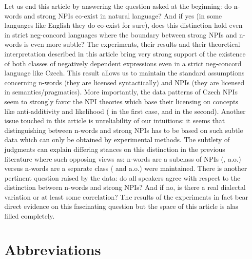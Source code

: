 \documentclass[output=paper,
]{langscibook}
\begin{document}
Let us end this article by answering the question asked at the beginning: do  n-words and strong NPIs co-exist in natural language? And if yes (in some languages like English they do co-exist for sure), does this distinction hold even in strict neg-concord languages where the boundary between strong NPIs and n-words is even more subtle? The experiments, their results and their theoretical interpretation described in this article bring very strong support of the existence of both classes of negatively dependent expressions even in a strict neg-concord language like Czech. This result allows us to maintain the standard assumptions concerning n-words (they are licensed syntactically) and   NPIs (they are licensed in semantics/pragmatics). More importantly, the data patterns of Czech NPIs seem to strongly favor the NPI theories which base their licensing on concepts like  anti-additivity and likelihood (\citealt{zwarts1998three} in the first case, \citealt{heim1984note} and \citealt{crnivc2014against} in the second). Another issue touched in this article is unreliability of our intuitions: it seems that distinguishing between n-words and strong NPIs has to be based on such subtle data which can only be obtained by experimental methods. The subtlety of judgments can explain differing stances on this distinction in the previous literature where such opposing views as: n-words are a subclass of NPIs (\citealt{ladusaw1992expressing}, \citealt{fualuaus2016fragment} a.o.) versus n-words are a separate class (\citealt{zeijlstra2008negative} and \citealt{giannakidou2017landscape} a.o.) were maintained. There is another pertinent question raised by the data: do all speakers agree with respect to the distinction between n-words and strong NPIs? And if no, is there a real dialectal variation or at least some correlation? The results of the experiments in fact bear direct evidence on this fascinating question  but the space of this article is alas filled completely.

\section*{Abbreviations}
\end{document}
